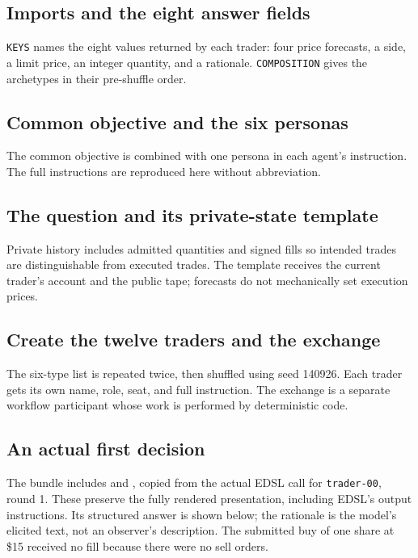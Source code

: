 \documentclass[11pt,letterpaper]{article}
\newcommand{\code}[1]{\texttt{\small #1}}
\begin{document}
\subsection{Imports and the eight answer fields}
\WalkImports
{}
\par\noindent
\begin{minipage}{\linewidth}
\WalkSchema
\code{KEYS} names the eight values returned by each trader: four price
forecasts, a side, a limit price, an integer quantity, and a rationale.
\code{COMPOSITION} gives the archetypes in their pre-shuffle order.
\end{minipage}
\par

\subsection{Common objective and the six personas}
The common objective is combined with one persona in each agent's instruction.
The full instructions are reproduced here without abbreviation.
\WalkPersonas

\subsection{The question and its private-state template}
Private history includes admitted quantities and signed fills so intended
trades are distinguishable from executed trades. The template receives the
current trader's account and the public tape; forecasts do not mechanically
set execution prices.
\WalkQuestion

\subsection{Create the twelve traders and the exchange}
The six-type list is repeated twice, then shuffled using seed 140926. Each
trader gets its own name, role, seat, and full instruction. The exchange is a
separate workflow participant whose work is performed by deterministic code.
\WalkAgents

\Needspace{0.52\textheight}
\subsection*{An actual first decision}
The bundle includes  and
, copied from the actual EDSL call for
\code{trader-00}, round 1. These preserve the fully rendered presentation,
including EDSL's output instructions. Its structured answer is shown below;
the rationale is the model's elicited text, not an observer's description.
The submitted buy of one share at \$15 received no fill because there were no
sell orders.

\end{document}
